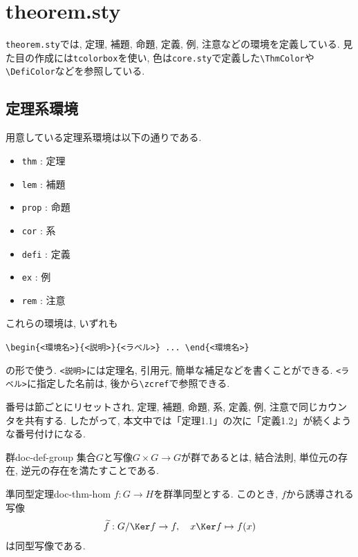 \documentclass[../main.tex]{subfiles}
\begin{document}
\section{theorem.sty}

\texttt{theorem.sty}では, 定理, 補題, 命題, 定義, 例, 注意などの環境を定義している. 
見た目の作成には\texttt{tcolorbox}を使い, 色は\texttt{core.sty}で定義した\verb|\ThmColor|や\verb|\DefiColor|などを参照している. 

\subsection{定理系環境}

用意している定理系環境は以下の通りである. 
\begin{itemize}
	\item \verb|thm| : 定理
	\item \verb|lem| : 補題
	\item \verb|prop| : 命題
	\item \verb|cor| : 系
	\item \verb|defi| : 定義
	\item \verb|ex| : 例
	\item \verb|rem| : 注意
\end{itemize}

これらの環境は, いずれも
\begin{center}
	\verb|\begin{<環境名>}{<説明>}{<ラベル>} ... \end{<環境名>}|
\end{center}
の形で使う. 
\verb|<説明>|には定理名, 引用元, 簡単な補足などを書くことができる. 
\verb|<ラベル>|に指定した名前は, 後から\verb|\zcref|で参照できる. 

番号は節ごとにリセットされ, 定理, 補題, 命題, 系, 定義, 例, 注意で同じカウンタを共有する. 
したがって, 本文中では「定理1.1」の次に「定義1.2」が続くような番号付けになる. 

\begin{defi}{群}{doc-def-group}
	集合$G$と写像$G\times G\to G$が群であるとは, 結合法則, 単位元の存在, 逆元の存在を満たすことである. 
\end{defi}

\begin{thm}{準同型定理}{doc-thm-hom}
	$f:G\to H$を群準同型とする. 
	このとき, $f$から誘導される写像
	\begin{align}
		\tilde{f}:G/\Ker f\to \Im f,\quad x\Ker f\mapsto f(x) \label{doc-thm-hom-map}
	\end{align}
	は同型写像である. 
\end{thm}
\end{document}
